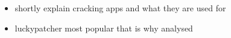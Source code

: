 \begin{itemize}
    \item shortly explain cracking apps and what they are used for
    \item luckypatcher most popular that is why analysed
\end{itemize}
